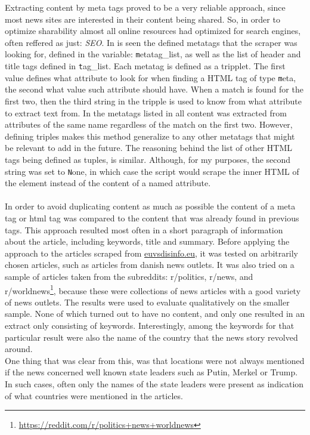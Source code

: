 \documentclass{article}
\begin{document}
Extracting content by meta tags proved to be a very reliable approach, since most news sites are interested in their content being shared. So, in order to optimize sharability almost all online resources had optimized for search engines, often reffered as just: {\it SEO}. In  is seen the defined metatags that the scraper was looking for, defined in the variable: {\texttt metatag\_list}, as well as the list of header and title tags defined in {\texttt tag\_list}. Each metatag is defined as a tripplet. The first value defines what attribute to look for when finding a HTML tag of type {\texttt meta}, the second what value such attribute should have. When a match is found for the first two, then the third string in the tripple is used to know from what attribute to extract text from. In the metatags listed in  all content was extracted from attributes of the same name regardless of the match on the first two. However, defining triples makes this method generalize to any other metatags that might be relevant to add in the future. The reasoning behind the list of other HTML tags being defined as tuples, is similar. Although, for my purposes, the second string was set to {\texttt None}, in which case the script would scrape the inner HTML of the element instead of the content of a named attribute.
\\\\
In order to avoid duplicating content as much as possible the content of a meta tag or html tag was compared to the content that was already found in previous tags. This approach resulted most often in a short paragraph of information about the article, including keywords, title and summary. Before applying the approach to the articles scraped from \href{https://www.euvsdisinfo.eu}{euvsdisinfo.eu}, it was tested on arbitrarily chosen articles, such as articles from danish news outlets. It was also tried on a sample of articles taken from the subreddits: r/politics, r/news, and {r/worldnews}\footnote{\url{https://reddit.com/r/politics+news+worldnews}}, because these were collections of news articles with a good variety of news outlets. The results were used to evaluate qualitatively on the smaller sample. None of which turned out to have no content, and only one resulted in an extract only consisting of keywords. Interestingly, among the keywords for that particular result were also the name of the country that the news story revolved around. \\
One thing that was clear from this, was that locations were not always mentioned if the news concerned well known state leaders such as Putin, Merkel or Trump. In such cases, often only the names of the state leaders were present as indication of what countries were mentioned in the articles.
\end{document}

